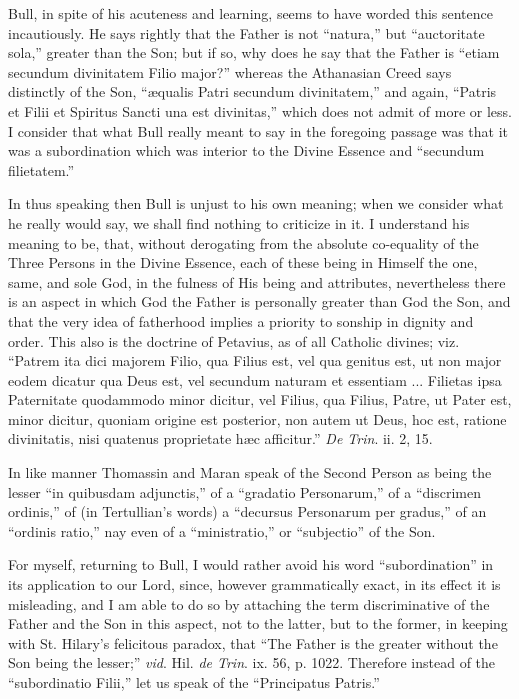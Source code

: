 Bull, in spite of his acuteness and learning, seems to have worded
this sentence incautiously. He says rightly that the Father is not
``natura,'' but ``auctoritate sola,'' greater than the
Son; but if so, why does he say that the Father is ``etiam
secundum divinitatem Filio major?'' whereas the Athanasian Creed
says distinctly of the Son, ``æqualis Patri secundum divinitatem,''
and again, ``Patris et Filii et Spiritus Sancti una est divinitas,''
which does not admit of more or less. I consider that what Bull really
meant to say in the foregoing passage was that it was a subordination
which was interior to the Divine Essence and ``secundum filietatem.''

In thus speaking then Bull is unjust to his own meaning; when we
consider what he really would say, we shall find nothing to criticize
in it. I understand his meaning to be, that, without derogating from
the absolute co-equality of the Three Persons in the Divine
Essence, each of these being in Himself the one, same, and sole God,
in the fulness of His being and attributes, nevertheless there is an
aspect in which God the Father is personally greater than God the Son,
and that the very idea of fatherhood implies a priority to sonship in
dignity and order. This also is the doctrine of Petavius, as of all
Catholic divines; viz. ``Patrem ita dici majorem Filio, qua Filius
est, vel qua genitus est, ut non major eodem dicatur qua Deus est, vel
secundum naturam et essentiam ... Filietas ipsa Paternitate quodammodo
minor dicitur, vel Filius, qua Filius, Patre, ut Pater est, minor
dicitur, quoniam origine est posterior, non autem ut Deus, hoc est,
ratione divinitatis, nisi quatenus proprietate hæc afficitur.'' \emph{De
Trin}. ii. 2, 15.

In like manner Thomassin and Maran speak of the Second Person as
being the lesser ``in quibusdam adjunctis,'' of a ``gradatio
Personarum,'' of a ``discrimen ordinis,'' of (in
Tertullian's words) a ``decursus Personarum per gradus,'' of
an ``ordinis ratio,'' nay even of a ``ministratio,''
or ``subjectio'' of the Son.

For myself, returning to Bull, I would rather avoid his word
``subordination'' in its application to our Lord, since,
however grammatically exact, in its effect it is misleading, and I am
able to do so by attaching the term discriminative of the Father and
the Son in this aspect, not to the latter, but to the former, in
keeping with St. Hilary's felicitous paradox, that ``The Father is
the greater without the Son being the lesser;'' \emph{vid}. Hil. \emph{de
Trin}. ix. 56, p. 1022. Therefore instead of the ``subordinatio
Filii,'' let us speak of the ``Principatus Patris.''

